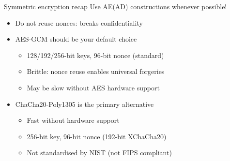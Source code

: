 \begin{frame}{Symmetric encryption recap}
  Use AE(AD) constructions whenever possible!
  \begin{itemize}[<+(1)->]
    \item Do not reuse nonces: breaks confidentiality
    
    \vspace*{0.5em}

    \item AES-GCM should be your default choice
    \begin{itemize}
      \item 128/192/256-bit keys, 96-bit nonce (standard)
      \item Brittle: nonce reuse enables universal forgeries
      \item May be slow without AES hardware support
    \end{itemize}

    \vspace*{0.5em}

    \item ChaCha20-Poly1305 is the primary alternative
    \begin{itemize}[<+(1)->]
      \item Fast without hardware support
      \item 256-bit key, 96-bit nonce (192-bit XChaCha20)
      \item Not standardised by NIST (not FIPS compliant)
    \end{itemize}
  \end{itemize}
\end{frame}

